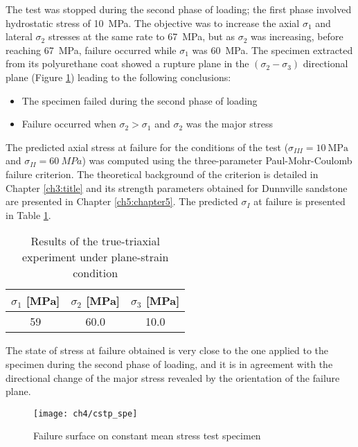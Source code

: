 The test was stopped during the second phase of loading; the first phase involved hydrostatic stress of \SI{10}{MPa}. The objective was to increase the axial $\sigma_1$ and lateral $\sigma_2$ stresses at the same rate to \SI{67}{MPa}, but as $\sigma_2$  was increasing, before reaching \SI{67}{MPa}, failure occurred while $\sigma_1$ was \SI{60}{MPa}. The specimen extracted from its polyurethane coat showed a rupture plane in the $(\sigma_{2}-\sigma_{3})$ directional plane (Figure \ref{fig4:ctsp_spe}) leading to the following conclusions:
\begin{itemize}
    \item The specimen failed during the second phase of loading
    \item Failure occurred when $\sigma_2>\sigma_1$ and $\sigma_{2}$ was the major stress
\end{itemize}
The predicted axial stress at failure for the conditions of the test ($\sigma_{III}=\SI{10}{\mega\pascal}$ and $\sigma_{II}=\SI{60}{MPa}$) was computed using the three-parameter Paul-Mohr-Coulomb failure criterion. The theoretical background of the criterion is detailed in Chapter \ref{ch3:title} and its strength parameters obtained for Dunnville sandstone are presented in Chapter \ref{ch5:chapter5}. The predicted $\sigma_I$ at failure is presented in Table \ref{tb4:TT3_sol}.
\begin{table}
    \centering
    \caption{Results of the true-triaxial experiment under plane-strain condition}
    \begin{tabular}{ccc}
        \hline
        $\sigma_1$ [\si{MPa}] & $\sigma_2$ [\si{MPa}] & $\sigma_3$ [\si{MPa}] \\
        \hline
        \hline
        59 & 60.0 & 10.0 \\
        \hline
    \end{tabular}
    \label{tb4:TT3_sol}
\end{table}
The state of stress at failure obtained is very close to the one applied to the specimen during the second phase of loading, and  it is in agreement with the directional change of the major stress revealed by the orientation of the failure plane.

\begin{figure}[tb]
    \centering
    \texttt{[image: ch4/cstp\_spe]}
    \caption{Failure surface on constant mean stress test specimen}
    \label{fig4:ctsp_spe}
\end{figure}